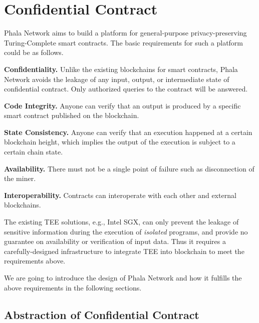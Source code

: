 \section{Confidential Contract}

Phala Network aims to build a platform for general-purpose privacy-preserving Turing-Complete smart contracts. The basic requirements for such a platform could be as follows.

\begin{icompact}
    \item \textbf{Confidentiality.}
    Unlike the existing blockchains for smart contracts, Phala Network avoids the leakage of any input, output, or intermediate state of confidential contract. Only authorized queries to the contract will be answered.

    \item \textbf{Code Integrity.}
    Anyone can verify that an output is produced by a specific smart contract published on the blockchain.

    \item \textbf{State Consistency.}
    Anyone can verify that an execution happened at a certain blockchain height, which implies the output of the execution is subject to a certain chain state.

    \item \textbf{Availability.}
    There must not be a single point of failure such as disconnection of the miner.

    \item \textbf{Interoperability.}
    Contracts can interoperate with each other and external blockchains.
\end{icompact}

The existing TEE solutions, e.g., Intel SGX, can only prevent the leakage of sensitive information during the execution of \textit{isolated} programs, and provide no guarantee on availability or verification of input data. Thus it requires a carefully-designed infrastructure to integrate TEE into blockchain to meet the requirements above.

We are going to introduce the design of Phala Network and how it fulfills the above requirements in the following sections.

\subsection{Abstraction of Confidential Contract}

